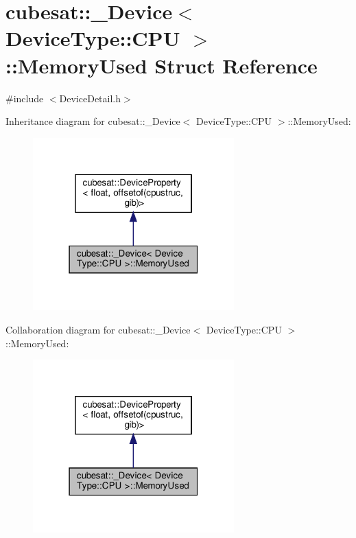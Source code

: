 \hypertarget{structcubesat_1_1__Device_3_01DeviceType_1_1CPU_01_4_1_1MemoryUsed}{}\section{cubesat\+:\+:\+\_\+\+Device$<$ Device\+Type\+:\+:C\+PU $>$\+:\+:Memory\+Used Struct Reference}
\label{structcubesat_1_1__Device_3_01DeviceType_1_1CPU_01_4_1_1MemoryUsed}


{\ttfamily \#include $<$Device\+Detail.\+h$>$}



Inheritance diagram for cubesat\+:\+:\+\_\+\+Device$<$ Device\+Type\+:\+:C\+PU $>$\+:\+:Memory\+Used\+:\nopagebreak
\begin{figure}[H]
\begin{center}
\leavevmode
\includegraphics[width=220pt]{structcubesat_1_1__Device_3_01DeviceType_1_1CPU_01_4_1_1MemoryUsed__inherit__graph}
\end{center}
\end{figure}


Collaboration diagram for cubesat\+:\+:\+\_\+\+Device$<$ Device\+Type\+:\+:C\+PU $>$\+:\+:Memory\+Used\+:\nopagebreak
\begin{figure}[H]
\begin{center}
\leavevmode
\includegraphics[width=220pt]{structcubesat_1_1__Device_3_01DeviceType_1_1CPU_01_4_1_1MemoryUsed__coll__graph}
\end{center}
\end{figure}
